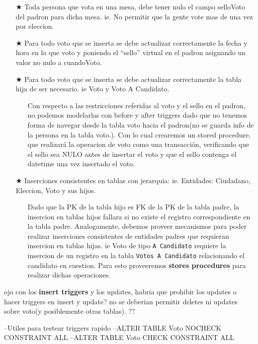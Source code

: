 \begin{itemize}
		\item[$\bigstar$] Toda persona que vota en una mesa, debe tener nulo el campo selloVoto del padron para dicha mesa. ie. No permitir que la gente vote mas de una vez por eleccion.
		\item[$\bigstar$] Para todo voto que se inserta se debe actualizar correctamente la fecha y hora en la que voto y poniendo el “sello” virtual en el padron asignando un valor no nulo a cuandoVoto.
		\item[$\bigstar$] Para todo voto que se inserta se debe actualizar correctamente la tabla hija de ser necesario. ie Voto y Voto A Candidato.
		\begin{itemize}
			\item[\Checkmark] Con respecto a las restricciones referidas al voto y el sello en el padron, no podemos modelarlas con before y after triggers dado que no tenemos forma de navegar desde la tabla voto hacia el padron(no se guarda info de la persona en la tabla voto.). Con lo cual crearemos un stored procedure, que realizará la operacion de voto como una transacción, verificando que el sello sea NULO antes de insertar el voto y que el sello contenga el datetime una vez insertado el voto. 
		\end{itemize}
\end{itemize}
\vspace{1.2cm}
\begin{itemize}
	\item[$\bigstar$] Inserciones consistentes en tablas con jerarquia: ie. Entidades: Ciudadano, Eleccion, Voto y sus hijos. 
	\begin{itemize}
		\item[\Checkmark] Dado que la PK de la tabla hijo es FK de la PK de la tabla padre, la insercion en tablas hijos fallara si no existe el registro correspondiente en la tabla padre. Analogamente, debemos proveer mecanismos para poder realizar inserciones consistentes de entidades padres que requieran insercion en tablas hijas. ie Voto de tipo \texttt{A Candidato} requiere la insercion de un registro en la tabla \texttt{Votos A Candidato} relacionando el candidato en cuestion. Para esto proveeremos \textbf{stores procedures} para realizar dichas operaciones. 
	\end{itemize}
\end{itemize}


ojo con los \textbf{insert triggers} y los updates, habria que prohibir los updates o hacer triggers en insert y update?
no se deberian permitir deletes ni updates sobre voto(y posiblemente otras tablas). ??

--Utiles para testear triggers rapido
--ALTER TABLE Voto NOCHECK CONSTRAINT ALL
--ALTER TABLE Voto CHECK CONSTRAINT ALL